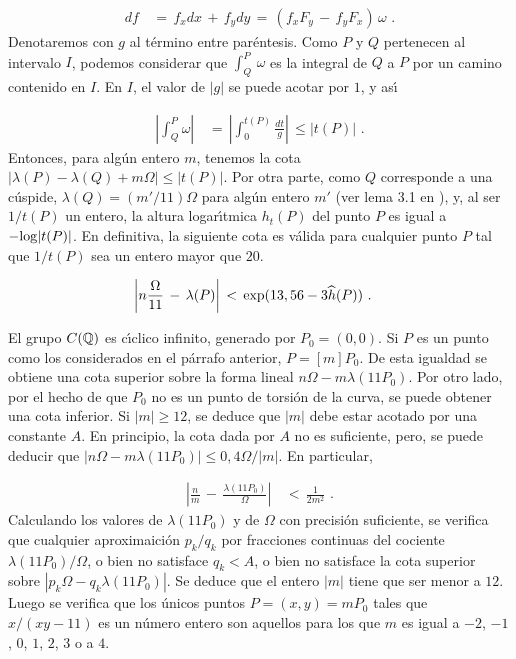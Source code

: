 \begin{align*}
df & \,=\,f_{x}dx\,+\,f_{y}dy\,=\,
\left(f_{x}F_{y}\,-\,f_{y}F_{x}\right)\,\omega\text{ .}
\end{align*}
Denotaremos con $g$ al t\'{e}rmino entre par\'{e}ntesis.
Como $P$ y $Q$ pertenecen al intervalo $I$, podemos considerar
que $\int_{Q}^{P}\,\omega$ es la integral de $Q$ a $P$ por
un camino contenido en $I$. En $I$, el valor de $|g|$ se puede
acotar por $1$, y as\'{\i}

\begin{align*}
\left|\int_{Q}^{P}\omega\right| & \,=\,
\left|\int_{0}^{t(P)}\frac{dt}{g}\right|\,\leq|t(P)|
\text{ .}
\end{align*}
Entonces, para alg\'{u}n entero $m$, tenemos la cota
$|\lambda(P)-\lambda(Q)+m\Omega|\leq|t(P)|$. Por otra parte, como
$Q$ corresponde a una c\'{u}spide, $\lambda(Q)=(m'/11)\Omega$
para alg\'{u}n entero $m'$ (ver lema 3.1 en \cite{schoofTzanakisLevelEleven}), y,
al ser $1/t(P)$ un entero, la altura logar\'{\i}tmica $h_{t}(P)$ del
punto $P$ es igual a $-\rm{log}|t(P)|$. En definitiva, la siguiente cota
es v\'{a}lida para cualquier punto $P$ tal que $1/t(P)$ sea un entero
mayor que $20$.

\begin{align*}
\left| n\frac{\Omega}{11}\,-\,\lambda(P) \right| &
\,<\,\rm{exp}(13,56-3\widehat{h}(P))\text{ .}
\end{align*}

El grupo $C(\bb{Q})$ es c\'{\i}clico infinito, generado por
$P_{0}=(0,0)$. Si $P$ es un punto como los considerados en el
p\'{a}rrafo anterior, $P=[m]P_{0}$. De esta igualdad se obtiene una
cota superior sobre la forma lineal $n\Omega-m\lambda(11P_{0})$. Por
otro lado, por el hecho de que $P_{0}$ no es un punto de torsi\'{o}n
de la curva, se puede obtener una cota inferior.
Si $|m|\geq 12$, se deduce que $|m|$ debe estar acotado por una
constante $A$. En principio, la cota dada por $A$ no es suficiente,
pero, se puede deducir que
$|n\Omega-m\lambda(11P_{0})|\leq 0,4\Omega/|m|$. En particular,

\begin{align*}
\left| \frac{n}{m}\,-\,\frac{\lambda(11P_{0})}{\Omega} \right|
&\,<\,\frac{1}{2m^{2}}\text{ .}
\end{align*}
Calculando los valores de $\lambda(11P_{0})$ y de $\Omega$ con
precisi\'{o}n suficiente, se verifica que cualquier aproximaici\'{o}n
$p_{k}/q_{k}$ por fracciones continuas del cociente
$\lambda(11P_{0})/\Omega$, o bien no satisface $q_{k}<A$, o bien no
satisface la cota superior sobre
$|p_{k}\Omega-q_{k}\lambda(11P_{0})|$.
Se deduce que el entero $|m|$ tiene que ser menor a $12$. Luego
se verifica que los \'{u}nicos puntos $P=(x,y)=mP_{0}$ tales que
$x/(xy-11)$ es un n\'{u}mero entero son aquellos para los que
$m$ es igual a $-2$, $-1$, $0$, $1$, $2$, $3$ o a $4$.


